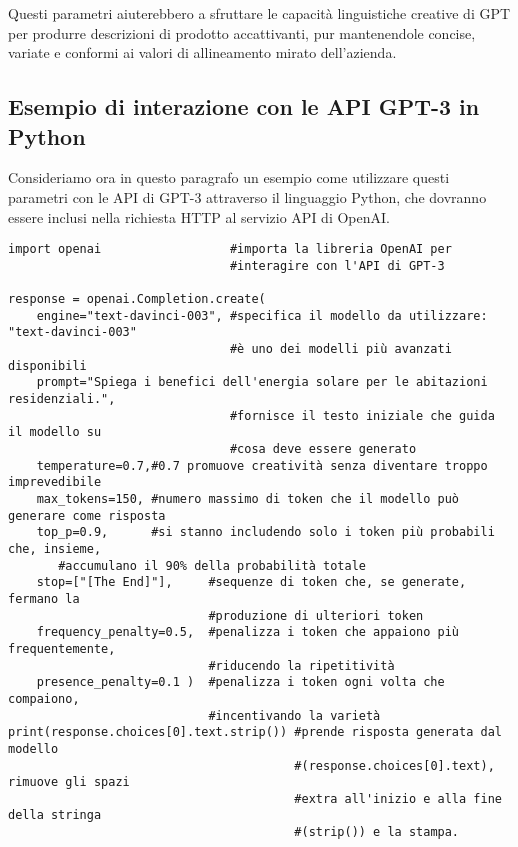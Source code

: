         Questi parametri aiuterebbero a sfruttare le capacità linguistiche creative di GPT per produrre descrizioni di prodotto accattivanti, pur mantenendole concise, variate e conformi ai valori di allineamento mirato dell'azienda.
        
    \subsection{Esempio di interazione con le API GPT-3 in Python}
        Consideriamo ora in questo paragrafo un esempio come utilizzare questi parametri con le API di GPT-3 attraverso il linguaggio Python, che dovranno essere inclusi nella richiesta HTTP al servizio API di OpenAI.

        \begin{Verbatim}[frame=single]
import openai                  #importa la libreria OpenAI per
                               #interagire con l'API di GPT-3

response = openai.Completion.create(
    engine="text-davinci-003", #specifica il modello da utilizzare: "text-davinci-003"
                               #è uno dei modelli più avanzati disponibili
    prompt="Spiega i benefici dell'energia solare per le abitazioni residenziali.",
                               #fornisce il testo iniziale che guida il modello su
                               #cosa deve essere generato
    temperature=0.7,#0.7 promuove creatività senza diventare troppo imprevedibile
    max_tokens=150,	#numero massimo di token che il modello può generare come risposta
    top_p=0.9,      #si stanno includendo solo i token più probabili che, insieme,
       #accumulano il 90% della probabilità totale
    stop=["[The End]"],    	#sequenze di token che, se generate, fermano la
                           	#produzione di ulteriori token
    frequency_penalty=0.5,	#penalizza i token che appaiono più frequentemente,
                           	#riducendo la ripetitività
    presence_penalty=0.1 )	#penalizza i token ogni volta che compaiono,
                          	#incentivando la varietà
print(response.choices[0].text.strip()) #prende risposta generata dal modello
                                        #(response.choices[0].text), rimuove gli spazi
                                        #extra all'inizio e alla fine della stringa
                                        #(strip()) e la stampa.
        \end{Verbatim}

